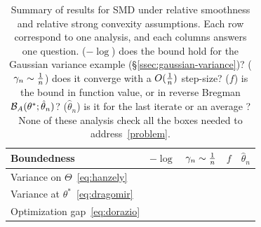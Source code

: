 \documentclass[twoside]{article}
\newcommand*{\expect}[2][]{\ensuremath{\mathbb{E}_{#1} \left[ #2 \right] }} %
\newcommand*{\expecti}[2][]{\ensuremath{\mathbb{E}_{#1} [ #2 ] }} %
\newcommand{\cond}{\,\vert\,}
\newcommand{\logpart}{A}
\newcommand{\bregman}{\cB_\logpart}
\newcommand{\nat}{\theta}
\newcommand{\m}{\mu}
\newcommand{\lr}{\gamma} %
\begin{document}
\begin{table}[t]
	\newcommand*{\greencmark}{\textcolor{Green}{\cmark}}
	\newcommand*{\redxmark}{\textcolor{Red}{\xmark}}
	\caption{Summary of results for SMD
		under relative smoothness and relative strong convexity assumptions.
		Each row correspond to one analysis, and each columns answers one question.
		($-\log$) does the bound hold for the Gaussian variance example (\S\ref{ssec:gaussian-variance})?
		($\lr_n \sim \inv{n}$) does it converge with a $O(\frac{1}{n})$ step-size?
		($f$) is the bound in function value, or in reverse Bregman $\bregman(\nat^* ; \hat\nat_n)$?
		($\hat\nat_n$) is it for the last iterate or an average ?
		None of these analysis check all the boxes needed to address~\eqref{problem}.
	}
	\begin{center}
		\begin{tabular}{lcccc}
			\toprule
			Boundedness & $-\log$ &  $\lr_n \sim \inv{n}$ & $f$ & $\hat\nat_n$ \\
			\midrule
			Variance on $\Theta$~\eqref{eq:hanzely} %
			& \redxmark & \greencmark & \greencmark  & \redxmark
			\\
			Variance at $\theta^*$~\eqref{eq:dragomir} %
			& \redxmark & \greencmark & \redxmark  & \greencmark
			\\
			Optimization gap~\eqref{eq:dorazio} %
			& \greencmark & \redxmark & \redxmark & \greencmark
			\\
			\bottomrule
		\end{tabular}
	\end{center}
	\label{tbl:assumptions}
\end{table}


\end{document}

